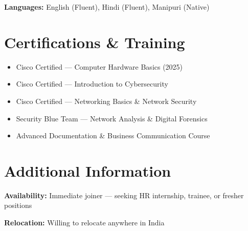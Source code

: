 \documentclass[10pt, a4paper]{article}
\begin{document}
\noindent\textbf{Languages:} English (Fluent), Hindi (Fluent), Manipuri (Native)

\vspace{6pt}

\section{Certifications \& Training}

\begin{itemize}
  \item Cisco Certified — Computer Hardware Basics (2025)
  \item Cisco Certified — Introduction to Cybersecurity
  \item Cisco Certified — Networking Basics \& Network Security
  \item Security Blue Team — Network Analysis \& Digital Forensics
  \item Advanced Documentation \& Business Communication Course
\end{itemize}

\vspace{6pt}

\section{Additional Information}

\noindent\textbf{Availability:} Immediate joiner — seeking HR internship, trainee, or fresher positions

\noindent\textbf{Relocation:} Willing to relocate anywhere in India

\end{document}
